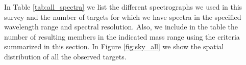 \documentclass[12pt]{article}
\begin{document}
In Table \ref{tab:all_spectra} we list the different spectrographs we used in this survey and the number of targets for which we have spectra in the specified wavelength range and spectral resolution. Also, we include in the table the number of resulting members in the indicated mass range using the criteria summarized in this section. In Figure \ref{fig:sky_all} we show the spatial distribution of all the observed targets.
\end{document}
